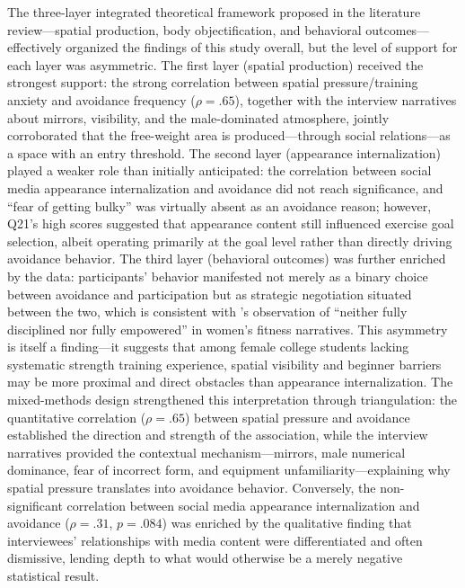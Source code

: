 The three-layer integrated theoretical framework proposed in the literature review---spatial production, body objectification, and behavioral outcomes---effectively organized the findings of this study overall, but the level of support for each layer was asymmetric.
The first layer (spatial production) received the strongest support: the strong correlation between spatial pressure/training anxiety and avoidance frequency ($\rho = .65$), together with the interview narratives about mirrors, visibility, and the male-dominated atmosphere, jointly corroborated that the free-weight area is produced---through social relations---as a space with an entry threshold.
The second layer (appearance internalization) played a weaker role than initially anticipated: the correlation between social media appearance internalization and avoidance did not reach significance, and ``fear of getting bulky'' was virtually absent as an avoidance reason; however, Q21's high scores suggested that appearance content still influenced exercise goal selection, albeit operating primarily at the goal level rather than directly driving avoidance behavior.
The third layer (behavioral outcomes) was further enriched by the data: participants' behavior manifested not merely as a binary choice between avoidance and participation but as strategic negotiation situated between the two, which is consistent with \textcite{xiong2021fanshen}'s observation of ``neither fully disciplined nor fully empowered'' in women's fitness narratives.
This asymmetry is itself a finding---it suggests that among female college students lacking systematic strength training experience, spatial visibility and beginner barriers may be more proximal and direct obstacles than appearance internalization.
The mixed-methods design strengthened this interpretation through triangulation: the quantitative correlation ($\rho = .65$) between spatial pressure and avoidance established the direction and strength of the association, while the interview narratives provided the contextual mechanism---mirrors, male numerical dominance, fear of incorrect form, and equipment unfamiliarity---explaining why spatial pressure translates into avoidance behavior.
Conversely, the non-significant correlation between social media appearance internalization and avoidance ($\rho = .31$, $p = .084$) was enriched by the qualitative finding that interviewees' relationships with media content were differentiated and often dismissive, lending depth to what would otherwise be a merely negative statistical result.

